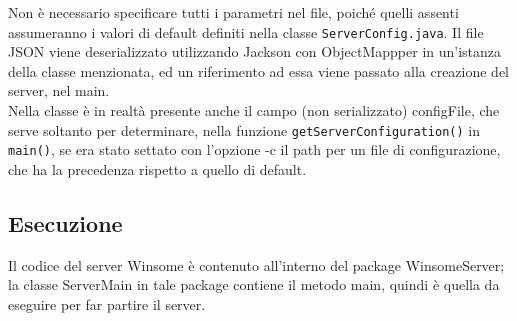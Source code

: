Non è necessario specificare tutti i parametri nel file, poiché quelli assenti assumeranno i valori di default definiti nella classe \verb|ServerConfig.java|. Il file JSON viene deserializzato utilizzando Jackson con ObjectMappper in un'istanza della classe menzionata, ed un riferimento ad essa viene passato alla creazione del server, nel main.\\
Nella classe è in realtà presente anche il campo (non serializzato) configFile, che serve soltanto per determinare, nella funzione \verb|getServerConfiguration()| in \verb|main()|, se era stato settato con l'opzione -c il path per un file di configurazione, che ha la precedenza rispetto a quello di default.

\subsection{Esecuzione}
Il codice del server Winsome è contenuto all'interno del package WinsomeServer; la classe ServerMain in tale package contiene il metodo main, quindi è quella da eseguire per far partire il server.

